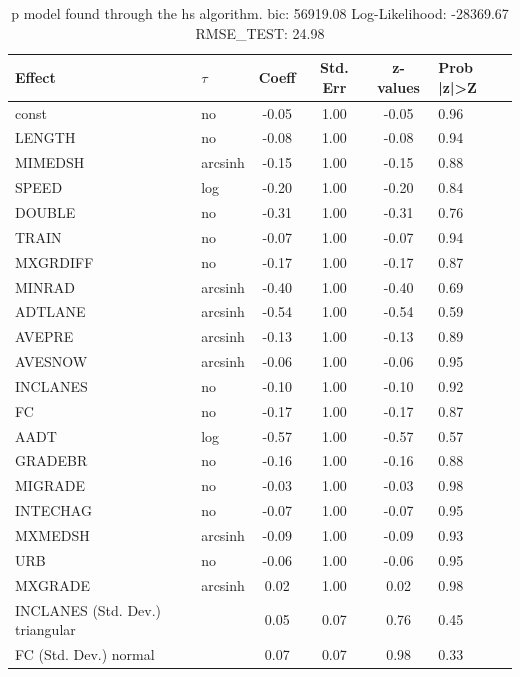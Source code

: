 \begin{table}
	\caption{p model found through the hs algorithm. bic: 56919.08 Log-Likelihood: -28369.67 RMSE_TEST: 24.98}
	\begin{center}
		\begin{tabular}{|l|l|c|c|c|l|}
			\hline
			Effect & $\tau$ & Coeff & Std. Err & z-values & Prob |z|>Z \\
			\hline
			const & no & -0.05 & 1.00 & -0.05 & 0.96 \\
			\hline
			LENGTH & no & -0.08 & 1.00 & -0.08 & 0.94 \\
			\hline
			MIMEDSH & arcsinh & -0.15 & 1.00 & -0.15 & 0.88 \\
			\hline
			SPEED & log & -0.20 & 1.00 & -0.20 & 0.84 \\
			\hline
			DOUBLE & no & -0.31 & 1.00 & -0.31 & 0.76 \\
			\hline
			TRAIN & no & -0.07 & 1.00 & -0.07 & 0.94 \\
			\hline
			MXGRDIFF & no & -0.17 & 1.00 & -0.17 & 0.87 \\
			\hline
			MINRAD & arcsinh & -0.40 & 1.00 & -0.40 & 0.69 \\
			\hline
			ADTLANE & arcsinh & -0.54 & 1.00 & -0.54 & 0.59 \\
			\hline
			AVEPRE & arcsinh & -0.13 & 1.00 & -0.13 & 0.89 \\
			\hline
			AVESNOW & arcsinh & -0.06 & 1.00 & -0.06 & 0.95 \\
			\hline
			INCLANES & no & -0.10 & 1.00 & -0.10 & 0.92 \\
			\hline
			FC & no & -0.17 & 1.00 & -0.17 & 0.87 \\
			\hline
			AADT & log & -0.57 & 1.00 & -0.57 & 0.57 \\
			\hline
			GRADEBR & no & -0.16 & 1.00 & -0.16 & 0.88 \\
			\hline
			MIGRADE & no & -0.03 & 1.00 & -0.03 & 0.98 \\
			\hline
			INTECHAG & no & -0.07 & 1.00 & -0.07 & 0.95 \\
			\hline
			MXMEDSH & arcsinh & -0.09 & 1.00 & -0.09 & 0.93 \\
			\hline
			URB & no & -0.06 & 1.00 & -0.06 & 0.95 \\
			\hline
			MXGRADE & arcsinh & 0.02 & 1.00 & 0.02 & 0.98 \\
			\hline
			INCLANES (Std. Dev.) triangular &  & 0.05 & 0.07 & 0.76 & 0.45 \\
			\hline
			FC (Std. Dev.) normal &  & 0.07 & 0.07 & 0.98 & 0.33 \\

\end{tabular}
\end{center}
\end{table}
